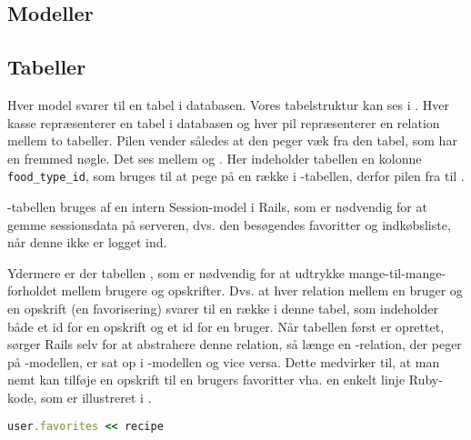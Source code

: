 \subsection{Modeller}



\subsection{Tabeller}
\label{sec:tabeller}

Hver model svarer til en tabel i databasen. Vores tabelstruktur kan ses i . Hver kasse repræsenterer en tabel i databasen og hver pil repræsenterer en relation mellem to tabeller. Pilen vender således at den peger væk fra den tabel, som har en fremmed nøgle. Det ses \fx mellem  og . Her indeholder tabellen  en kolonne \texttt{food\_type\_id}, som bruges til at pege på en række i -tabellen, derfor pilen fra  til .

-tabellen bruges af en intern Session-model i Rails, som er nødvendig for at gemme sessionsdata på serveren, dvs. \fx den besøgendes favoritter og indkøbsliste, når denne ikke er logget ind.

Ydermere er der tabellen , som er nødvendig for at udtrykke mange-til-mange-forholdet mellem brugere og opskrifter. Dvs. at hver relation mellem en bruger og en opskrift (en favorisering) svarer til en række i denne tabel, som indeholder både et id for en opskrift og et id for en bruger. Når tabellen først er oprettet, sørger Rails selv for at abstrahere denne relation, så længe en -relation, der peger på -modellen, er sat op i -modellen og vice versa. Dette medvirker til, at man \fx nemt kan tilføje en opskrift til en brugers favoritter vha. en enkelt linje Ruby-kode, som er illustreret i .

\begin{lstlisting}[caption={Hvis man har et \classref{User}-objekt i \texttt{user} (som f.eks. returneret med \lstinline{User.find_by_id(42)}) og et \classref{Recipe}-object i \texttt{recipe}, kan opskriften associeres med brugeren med denne linje Ruby-kode.},label=lst:rubymanytomany,language=Ruby]
user.favorites << recipe
\end{lstlisting}

